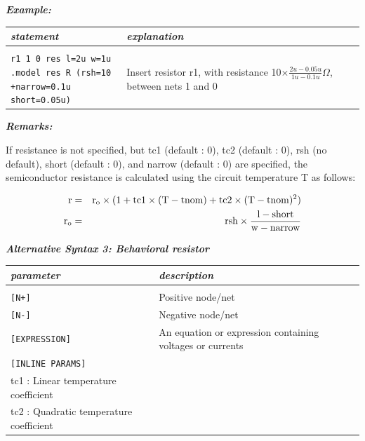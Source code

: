 {\textbf{\textit{Example:}}

\begin{longtable}{l l}
\textit{statement} & \textit{explanation} \\ \hline \\ %
		\parbox{15em}{\texttt{r1 1 0 res l=2u w=1u} \\
			\texttt{.model res R (rsh=10\\+narrow=0.1u short=0.05u)}} 
			& \parbox{25em}{{\small Insert resistor r1, with resistance 10$\times\frac{2u-0.05u}{1u-0.1u}\Omega$,\\between nets 1 and 0}} 
\end{longtable}


\textbf{\textit{Remarks:}}

If resistance is not specified, but tc1 (default : 0), tc2 (default : 0), rsh (no default), short (default : 0), and narrow (default : 0) are specified, the semiconductor resistance is calculated using the circuit temperature T as follows:

\begin{eqnarray}
\rm{r} &=& \rm{r}_o\times(1+\rm{tc1}\times(\rm{T}-\rm{tnom})+\rm{tc2}\times(\rm{T}-\rm{tnom})^2) \nonumber\\
\rm{r}_o &=& \rm{rsh}\times\frac{\rm{l}-\rm{short}}{\rm{w}-\rm{narrow}}\nonumber
\end{eqnarray} 


\textbf{\textit{Alternative Syntax 3: Behavioral resistor}}


\begin{longtable}{l l}
\textit{parameter} & \textit{description} \\ \hline \\ \vspace{-0.8\parskip}
\texttt{[N+]} & Positive node/net \\
\texttt{[N-]} & Negative node/net \\
\texttt{[EXPRESSION]} & An equation or expression containing voltages or currents \\
\texttt{[INLINE PARAMS]} & \begin{tabular}{lp{5.5cm}p{5cm}}\textit{Inline parameters :} \\ 
																					{\small tc1 : Linear temperature coefficient} \\
																					{\small tc2 : Quadratic temperature coefficient} 
																					\end{tabular} 																	
\end{longtable}

}
